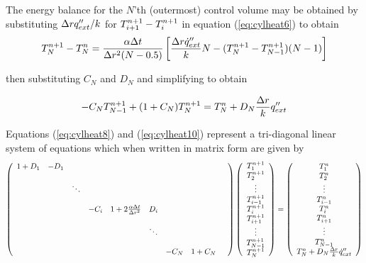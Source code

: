 \noindent The energy balance for the $N$'th (outermost) control volume may be obtained by substituting $\Delta r q''_{ext}/k$ for $T_{i+1}^{n+1}-T_{i}^{n+1}$ in equation (\ref{eq:cylheat6}) to obtain
\begin{eqnarray*}
T_N^{n+1}-T_N^n=\frac{\alpha\Delta t}{\Delta r^2(N-0.5)}
\left[\frac{\Delta r\dot{q}''_{ext}}{k}N-(T_N^{n+1}-T_{N-1}^{n+1})(N-1)\right]
\end{eqnarray*}

\noindent then substituting $C_N$ and $D_N$ and simplifying
to obtain

\begin{equation}
-C_NT_{N-1}^{n+1}+(1+C_N)T_N^{n+1}=T_N^n+D_N\frac{\Delta r}{k}q''_{ext}
\label{eq:cylheat10}
\end{equation}

Equations (\ref{eq:cylheat8}) and (\ref{eq:cylheat10}) represent a  tri-diagonal linear system of equations which when written in matrix form
are given by
\begin{equation}
\left(
\begin{array}{ccccccccc}
  1+D_1 & -D_1 &  &  &  &  &  &  &  \\
   &  &  &  &  &  &  &  &  \\
   &  &\ddots  &  &  &  &  &  &  \\
   &  &  &  &  &  &  &  &  \\
   &  &  & -C_i &1+2\frac{\alpha\Delta t}{\Delta r^2}  &D_i  &  &  &  \\
   &  &  &  &  &  &  &  &  \\
   &  &  &  &  & \ddots &  &  &  \\
   &  &  &  &  &  &  &  &  \\
   &  &  &  &  &  &-C_N  &1+C_N  &
\end{array}
\right)
\left(
  \begin{array}{c}
    T_1^{n+1}\\
    T_2^{n+1}\\
    \vdots\\
    T_{i-1}^{n+1} \\
    T_i^{n+1} \\
    T_{i+1}^{n+1}\\
    \vdots\\
    T_{N-1}^{n+1}\\
    T_N^{n+1}
  \end{array}
\right)
=
\left(
  \begin{array}{c}
    T_1^{n}\\
    T_2^{n}\\
    \vdots\\
    T_{i-1}^{n} \\
    T_i^{n} \\
    T_{i+1}^{n}\\
    \vdots\\
    T_{N-1}^{n}\\
    T_N^{n}+D_N\frac{\Delta r}{k}\dot{q}''_{ext}
  \end{array}
\right)
\label{eq:matrix}
\end{equation}

